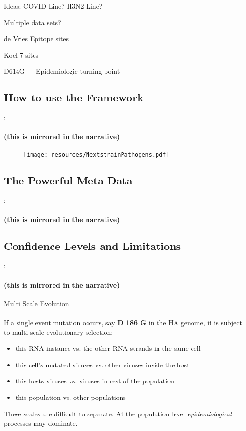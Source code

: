 \documentclass{beamer}
\begin{document}
\begin{darkframes}
\begin{frame}{\secname}
      Ideas: COVID-Line? H3N2-Line?

      Multiple data sets?

      de Vries Epitope sites

      Koel 7 sites

      D614G --- Epidemiologic turning point
    \end{frame}

    \subsection{How to use the Framework}
    \begin{frame}{\secname : \subsecname}
      \framesubtitle{(this is mirrored in the narrative)}
      \begin{figure}
        \texttt{[image: resources/NextstrainPathogens.pdf]}
        \caption{\footnotesize }
      \end{figure}
    \end{frame}

    \subsection{The Powerful Meta Data}
    \begin{frame}{\secname : \subsecname}
      \framesubtitle{(this is mirrored in the narrative)}
    \end{frame}

    \subsection{Confidence Levels and Limitations}
    \begin{frame}{\secname : \subsecname}
      \framesubtitle{(this is mirrored in the narrative)}
    \end{frame}

    \begin{frame}{Multi Scale Evolution}
      \framesubtitle{}
      If a single event mutation occurs, say \textbf{D 186 G} in the HA genome, it is subject to multi scale evolutionary selection:
      \begin{itemize}
        \item this RNA instance vs. the other RNA strands in the same cell
        \item this cell's mutated viruses vs. other viruses inside the host
        \item this hosts viruses vs. viruses in rest of the population
        \item this population vs. other populations
      \end{itemize}
      These scales are difficult to separate. At the population level \textit{epidemiological} processes may dominate.
    \end{frame}


\end{darkframes}
\end{document}
